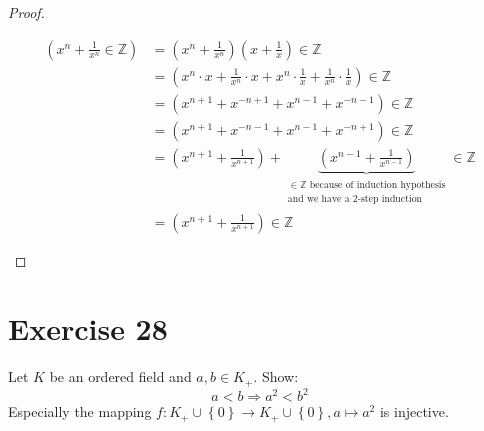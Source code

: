 \documentclass[a4paper]{article}
\theoremstyle{definition}
\newcommand\set[1]{\left\{#1\right\}}
\begin{document}
\begin{proof}
\begin{description}
      \begin{align*}
        \left(x^n + \frac1{x^n} \in \mathbb Z\right)
          &= \left(x^n + \frac1{x^n}\right)\left(x + \frac1x\right) \in \mathbb Z \\
          &= \left(x^n \cdot x + \frac1{x^n}\cdot x + x^n \cdot \frac1x + \frac1{x^n}\cdot \frac1x\right) \in \mathbb Z \\
          &= \left(x^{n+1} + x^{-n+1} + x^{n-1} + x^{-n-1}\right) \in \mathbb Z \\
          &= \left(x^{n+1} + x^{-n-1} + x^{n-1} + x^{-n+1}\right) \in \mathbb Z \\
          &= \left(x^{n+1} + \frac1{x^{n+1}}\right) + \underbrace{\left(x^{n-1} + \frac1{x^{n-1}}\right)}%
            _{\substack{\in \mathbb Z \text{ because of induction hypothesis} \\ \text{and we have a 2-step induction}}} \in \mathbb Z \\
          &= \left(x^{n+1} + \frac1{x^{n+1}}\right) \in \mathbb Z
      \end{align*}
  \end{description}
\end{proof}


\section{Exercise 28}
\begin{ex}
  Let $K$ be an ordered field and $a, b \in K_+$. Show:
  \[ a < b \Rightarrow a^2 < b^2 \]
  Especially the mapping $f: K_+ \cup \set{0} \rightarrow K_+ \cup \set{0},
  a \mapsto a^2$ is injective.
\end{ex}
\end{document}
